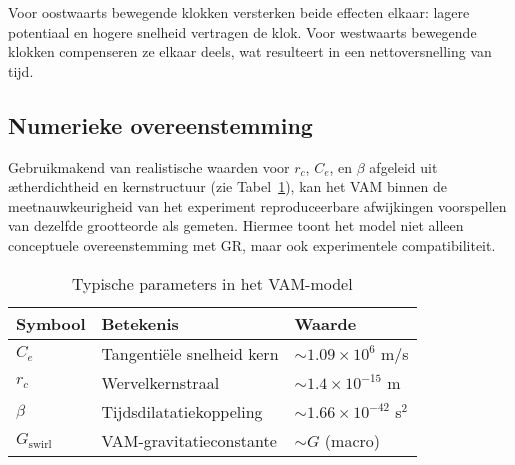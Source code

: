 Voor oostwaarts bewegende klokken versterken beide effecten elkaar: lagere potentiaal en hogere snelheid vertragen de klok. Voor westwaarts bewegende klokken compenseren ze elkaar deels, wat resulteert in een nettoversnelling van tijd.

\subsection{Numerieke overeenstemming}

Gebruikmakend van realistische waarden voor $r_c$, $C_e$, en $\beta$ afgeleid uit ætherdichtheid en kernstructuur (zie Tabel~\ref{tab:constants}), kan het VAM binnen de meetnauwkeurigheid van het experiment reproduceerbare afwijkingen voorspellen van dezelfde grootteorde als gemeten. Hiermee toont het model niet alleen conceptuele overeenstemming met GR, maar ook experimentele compatibiliteit.

\begin{table}[h!]
\centering
\caption{Typische parameters in het VAM-model}
\label{tab:constants}
\begin{tabular}{lll}
\toprule
Symbool & Betekenis & Waarde \\
\midrule
$C_e$ & Tangentiële snelheid kern & $\sim 1.09 \times 10^6$ m/s \\
$r_c$ & Wervelkernstraal & $\sim 1.4 \times 10^{-15}$ m \\
$\beta$ & Tijdsdilatatiekoppeling & $\sim 1.66 \times 10^{-42}$ s$^2$ \\
$G_{\text{swirl}}$ & VAM-gravitatieconstante & $\sim G$ (macro) \\
\bottomrule
\end{tabular}
\end{table}